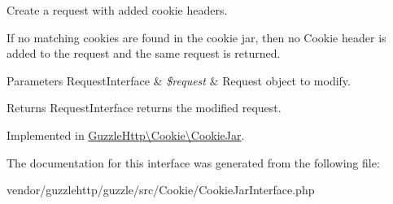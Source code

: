 Create a request with added cookie headers.

If no matching cookies are found in the cookie jar, then no Cookie header is added to the request and the same request is returned.


\begin{DoxyParams}[1]{Parameters}
Request\+Interface & {\em \$request} & Request object to modify.\\
\hline
\end{DoxyParams}
\begin{DoxyReturn}{Returns}
Request\+Interface returns the modified request. 
\end{DoxyReturn}


Implemented in \hyperlink{classGuzzleHttp_1_1Cookie_1_1CookieJar_acca0464fa0926e364848fe9c81f96714}{Guzzle\+Http\textbackslash{}\+Cookie\textbackslash{}\+Cookie\+Jar}.



The documentation for this interface was generated from the following file\+:\begin{DoxyCompactItemize}
\item 
vendor/guzzlehttp/guzzle/src/\+Cookie/Cookie\+Jar\+Interface.\+php\end{DoxyCompactItemize}
